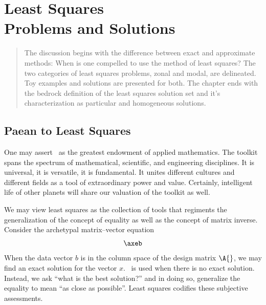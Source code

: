 
\renewcommand{\argon}[0]		{ \bl{ \mat{r}{-1\\1\\0}} }
\renewcommand{\boron}[0]		{ \bl{ \mat{r}{0\\-1\\1} } }

%
\chapter[Least Squares Problems and Solutions]
{\label{ch:Least Squares Problems and Solutions}Least Squares \\Problems and Solutions}

\begin{quotation}
The discussion begins with the difference between exact and approximate methods: When is one compelled to use the method of least squares? The two categories of least squares problems, zonal and modal, are delineated. Toy examples and solutions are presented for both. The chapter ends with the bedrock definition of the least squares solution set and it's characterization as particular and homogeneous solutions.
\end{quotation}

\section{Paean to Least Squares}
One may assert \tmls\ as the greatest endowment of applied mathematics. The toolkit spans the spectrum of mathematical, scientific, and engineering disciplines. It is universal, it is versatile, it is fundamental. It unites different cultures and different fields as a tool of extraordinary power and value. Certainly, intelligent life of other planets will share our valuation of the toolkit as well.

We may view least squares as the collection of tools that regiments the generalization of the concept of equality as well as the concept of matrix inverse. Consider the archetypal  matrix--vector equation
%
\begin{equation*}
	\axeb 
\end{equation*}
%
When the data vector $b$ is in the column space of the design matrix $\A{}$, we may find an exact solution for the vector $x$. \Tmls \ is used when there is no exact solution. Instead, we ask ``what is the best solution?'' and in doing so, generalize the equality to mean ``as close as possible''. Least squares codifies these subjective assessments.

